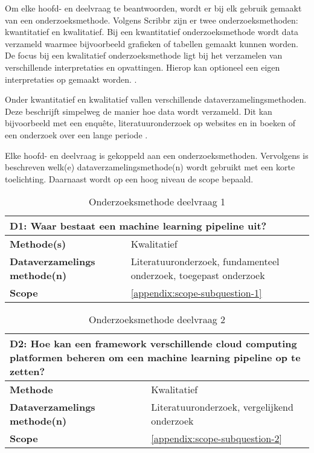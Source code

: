 
\renewcommand{\arraystretch}{1.35} %

Om elke hoofd- en deelvraag te beantwoorden, wordt er bij elk gebruik gemaakt van een onderzoeksmethode. Volgens Scribbr \cite{research-methods} zijn er twee onderzoeksmethoden: kwantitatief en kwalitatief. Bij een kwantitatief onderzoeksmethode wordt data verzameld waarmee bijvoorbeeld grafieken of tabellen gemaakt kunnen worden. De focus bij een kwalitatief onderzoeksmethode ligt bij het verzamelen van verschillende interpretaties en opvattingen. Hierop kan optioneel een eigen interpretaties op gemaakt worden. \cite{quantitative-vs-qualitative}.

Onder kwantitatief en kwalitatief vallen verschillende dataverzamelingsmethoden. Deze beschrijft simpelweg de manier hoe data wordt verzameld. Dit kan bijvoorbeeld met een enquête, literatuuronderzoek op websites en in boeken of een onderzoek over een lange periode \cite{quantitative-vs-qualitative}.

Elke hoofd- en deelvraag is gekoppeld aan een onderzoeksmethoden. Vervolgens is beschreven welk(e) dataverzamelingsmethode(n) wordt gebruikt met een korte toelichting. Daarnaast wordt op een hoog niveau de scope bepaald.

\begin{table}[hbt!]
  \centering
  \begin{tabular}{|p{.215\linewidth}|p{.72\linewidth}|}
  \hline
  \multicolumn{2}{|p{.97\linewidth}|}{\textbf{D1: Waar bestaat een machine learning pipeline uit?}} \\ \hline
    \textbf{Methode(s)}&
      Kwalitatief
    \\ \hline
    \textbf{Dataverzamelings methode(n)}&
      Literatuuronderzoek, fundamenteel onderzoek, toegepast onderzoek
    \\ \hline
    \textbf{Scope}&
      \autoref{appendix:scope-subquestion-1}
    \\ \hline
  \end{tabular}
  \caption{Onderzoeksmethode deelvraag 1}
  \label{table:research-method-subquestion-1}
\end{table}

\begin{table}[hbt!]
  \centering
  \begin{tabular}{|p{.215\linewidth}|p{.72\linewidth}|}
  \hline
  \multicolumn{2}{|p{.97\linewidth}|}{\textbf{D2: Hoe kan een framework verschillende cloud computing platformen beheren om een machine learning pipeline op te zetten?}} \\ \hline
    \textbf{Methode}&
      Kwalitatief
    \\ \hline
    \textbf{Dataverzamelings methode(n)}&
      Literatuuronderzoek, vergelijkend onderzoek
    \\ \hline
    \textbf{Scope}&
      \autoref{appendix:scope-subquestion-2}
    \\ \hline
  \end{tabular}
  \caption{Onderzoeksmethode deelvraag 2}
  \label{table:sq2}
\end{table}

